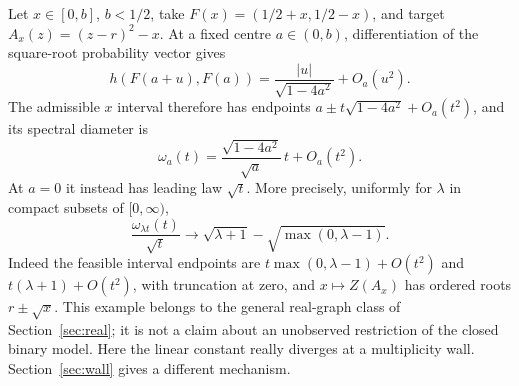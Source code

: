 \begin{example}\label{ex:crossover}
Let $x\in[0,b]$, $b<1/2$, take
$F(x)=(1/2+x,1/2-x)$, and target $A_x(z)=(z-r)^2-x$.
At a fixed centre $a\in(0,b)$, differentiation of the square-root
probability vector gives
\[
 h(F(a+u),F(a))=\frac{|u|}{\sqrt{1-4a^2}}+O_a(u^2).
\]
The admissible $x$ interval therefore has endpoints
$a\pm t\sqrt{1-4a^2}+O_a(t^2)$, and its spectral diameter is
\[
 \omega_a(t)=\frac{\sqrt{1-4a^2}}{\sqrt a}\,t+O_a(t^2).
\]
At $a=0$ it instead has leading law $\sqrt t$. More precisely, uniformly
for $\lambda$ in compact subsets of $[0,\infty)$,
\begin{equation}\label{eq:mult-transition}
 \frac{\omega_{\lambda t}(t)}{\sqrt t}
 \longrightarrow \sqrt{\lambda+1}-\sqrt{\max(0,\lambda-1)}.
\end{equation}
Indeed the feasible interval endpoints are
$t\max(0,\lambda-1)+O(t^2)$ and $t(\lambda+1)+O(t^2)$, with truncation
at zero, and $x\mapsto Z(A_x)$ has ordered roots $r\pm\sqrt x$.
This example belongs to the general real-graph class of
Section~\ref{sec:real}; it is not a claim about an unobserved restriction
of the closed binary model. Here the linear constant really diverges
at a multiplicity wall. Section~\ref{sec:wall} gives a different mechanism.
\end{example}
